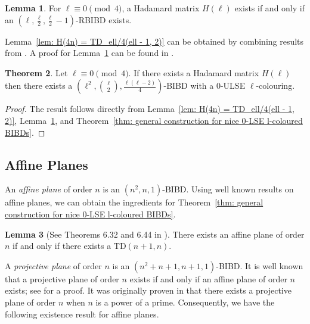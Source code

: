 \documentclass[12pt]{article}
\theoremstyle{definition}
\newtheorem{theorem}{Theorem}[section]
\newtheorem{lemma}[theorem]{Lemma}
\begin{document}
\begin{lemma}\label{lem: H(4n) = (4n, 4n/2, 4n/2 - 1)-RBIBD}
    For $\ell \equiv 0 \pmod{4}$, a Hadamard matrix $H(\ell)$ exists if and only if an $\left(\ell, \frac{\ell}{2}, \frac{\ell}{2} - 1\right)$-RBIBD exists.
\end{lemma}

Lemma~\ref{lem: H(4n) = TD_ell/4(ell - 1, 2)} can be obtained by combining results from \cite{H74, T33}. A proof for Lemma~\ref{lem: H(4n) = (4n, 4n/2, 4n/2 - 1)-RBIBD} can be found in \cite{BS70}.

\begin{theorem}\label{thm: Hadamard matrix gives 0-ULSE coloured BIBD}
    Let $\ell \equiv 0 \pmod{4}$. If there exists a Hadamard matrix $H(\ell)$ then there exists a $\left(\ell^2, \binom{\ell}{2}, \frac{\ell(\ell - 2)}{4}\right)$-BIBD with a $0$-ULSE $\ell$-colouring. 
\end{theorem}

\begin{proof}
    The result follows directly from Lemma~\ref{lem: H(4n) = TD_ell/4(ell - 1, 2)}, Lemma~\ref{lem: H(4n) = (4n, 4n/2, 4n/2 - 1)-RBIBD}, and Theorem~\ref{thm: general construction for nice 0-LSE l-coloured BIBDs}.
\end{proof}



\subsection{Affine Planes}

An \emph{affine plane} of order $n$ is an $(n^2, n, 1)$-BIBD. Using well known results on affine planes, we can obtain the ingredients for Theorem~\ref{thm: general construction for nice 0-LSE l-coloured BIBDs}.

\begin{lemma}[See Theorems 6.32 and 6.44 in \cite{S04}]\label{lem: affine plane implies TD}
    There exists an affine plane of order $n$ if and only if there exists a TD$(n+1,n)$.
\end{lemma}

A \emph{projective plane} of order $n$ is an $(n^2 + n + 1, n+1, 1)$-BIBD. It is well known that a projective plane of order $n$ exists if and only if an affine plane of order $n$ exists; see \cite{S04} for a proof. It was originally proven in \cite{VB1906} that there exists a projective plane of order $n$ when $n$ is a power of a prime. Consequently, we have the following existence result for affine planes.
\end{document}
